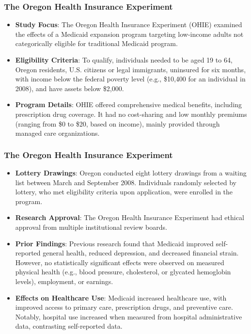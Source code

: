 \documentclass[notes,10pt, aspectratio=169]{beamer}
\begin{document}
\begin{frame}
\frametitle{The Oregon Health Insurance Experiment}

\begin{itemize}
  \item \textbf{Study Focus}: The Oregon Health Insurance Experiment (OHIE) examined the effects of a Medicaid expansion program targeting low-income adults not categorically eligible for traditional Medicaid program.\vspace{1em}

  \item \textbf{Eligibility Criteria}: To qualify, individuals needed to be aged 19 to 64, Oregon residents, U.S. citizens or legal immigrants, uninsured for six months, with income below the federal poverty level (e.g., \$10,400 for an individual in 2008), and have assets below \$2,000.\vspace{1em}

  \item \textbf{Program Details}: OHIE offered comprehensive medical benefits, including prescription drug coverage. It had no cost-sharing and low monthly premiums (ranging from \$0 to \$20, based on income), mainly provided through managed care organizations.\vspace{1em}
\end{itemize}
\end{frame}

\begin{frame}
\frametitle{The Oregon Health Insurance Experiment}

\begin{itemize}
  \item \textbf{Lottery Drawings}: Oregon conducted eight lottery drawings from a waiting list between March and September 2008. Individuals randomly selected by lottery, who met eligibility criteria upon application, were enrolled in the program.\vspace{1em}

  \item \textbf{Research Approval}: The Oregon Health Insurance Experiment had ethical approval from multiple institutional review boards.\vspace{1em}

  \item \textbf{Prior Findings}: Previous research found that Medicaid improved self-reported general health, reduced depression, and decreased financial strain. However, no statistically significant effects were observed on measured physical health (e.g., blood pressure, cholesterol, or glycated hemoglobin levels), employment, or earnings.\vspace{1em}

  \item \textbf{Effects on Healthcare Use}: Medicaid increased healthcare use, with improved access to primary care, prescription drugs, and preventive care. Notably, hospital use increased when measured from hospital administrative data, contrasting self-reported data.

\end{itemize}
\end{frame}
\end{document}

